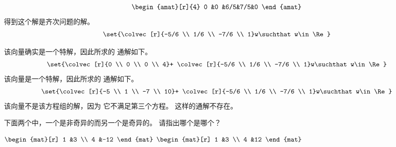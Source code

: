 \begin{exercises}
\begin{answer}
\begin{align*}
\begin{amat}[r]{4}
           0  &0   &6/5&7/5&0
        \end{amat}
      \end{align*}
      得到这个解是齐次问题的解。
      \begin{equation*}
        \set{\colvec[r]{-5/6 \\ 1/6 \\ -7/6 \\ 1}w\suchthat w\in\Re}
      \end{equation*}
      \begin{exparts}
        \partsitem 该向量确实是一个特解，因此所求的
          通解如下。
          \begin{equation*}
            \set{\colvec[r]{0 \\ 0 \\ 0 \\ 4}+
                 \colvec[r]{-5/6 \\ 1/6 \\ -7/6 \\ 1}w\suchthat w\in\Re}
          \end{equation*}
        \partsitem 该向量是一个特解，因此所求的
          通解如下。
          \begin{equation*}
            \set{\colvec[r]{-5 \\ 1 \\ -7 \\ 10}+
                 \colvec[r]{-5/6 \\ 1/6 \\ -7/6 \\ 1}w\suchthat w\in\Re}
          \end{equation*}
        \partsitem 该向量不是该方程组的解，因为
          它不满足第三个方程。
          这样的通解不存在。
      \end{exparts}
    \end{answer}
  \item
     下面两个中，一个是非奇异的而另一个是奇异的。
     请指出哪个是哪个？
     \begin{exparts*}
       \partsitem $\begin{mat}[r]
           1  &3   \\
           4  &-12
         \end{mat}$
       \partsitem $\begin{mat}[r]
           1  &3  \\
           4  &12
         \end{mat}$
     \end{exparts*}
     \begin{answer}

\end{answer}
\end{exercises}
